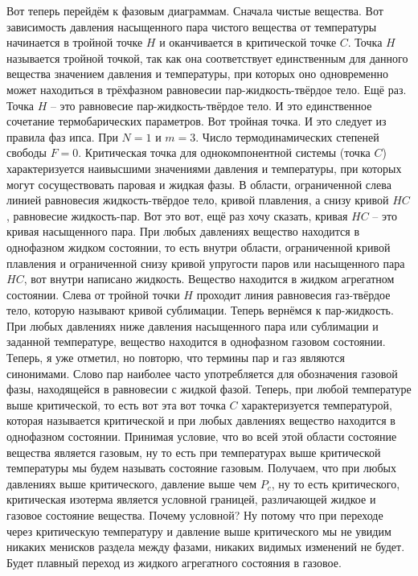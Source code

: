 \documentclass[main.tex]{subfiles}
\begin{document}
Вот теперь перейдём к фазовым диаграммам.
Сначала чистые вещества.
Вот зависимость давления насыщенного пара чистого вещества от температуры начинается в тройной точке $H$ и оканчивается в критической точке $C$.
Точка $H$ называется тройной точкой, так как она соответствует единственным для данного вещества значением давления и температуры, при которых оно одновременно может находиться в трёхфазном равновесии пар-жидкость-твёрдое тело.
Ещё раз.
Точка $H$ -- это равновесие пар-жидкость-твёрдое тело.
И это единственное сочетание термобарических параметров.
Вот тройная точка.
И это следует из правила фаз ипса.
При $N=1$ и $m=3$.
Число термодинамических степеней свободы $F=0$.
Критическая точка для однокомпонентной системы (точка $C$) характеризуется наивысшими значениями давления и температуры, при которых могут сосуществовать паровая и жидкая фазы.
В области, ограниченной слева линией равновесия жидкость-твёрдое тело, кривой плавления, а снизу кривой $HC$, равновесие жидкость-пар.
Вот это вот, ещё раз хочу сказать, кривая $HC$ -- это кривая насыщенного пара.
При любых давлениях вещество находится в однофазном жидком состоянии, то есть внутри области, ограниченной кривой плавления и ограниченной снизу кривой упругости паров или насыщенного пара $HC$, вот внутри написано жидкость.
Вещество находится в жидком агрегатном состоянии.
Слева от тройной точки $H$ проходит линия равновесия газ-твёрдое тело, которую называют кривой сублимации.
Теперь вернёмся к пар-жидкость.
При любых давлениях ниже давления насыщенного пара или сублимации и заданной температуре, вещество находится в однофазном газовом состоянии.
Теперь, я уже отметил, но повторю, что термины пар и газ являются синонимами.
Слово пар наиболее часто употребляется для обозначения газовой фазы, находящейся в равновесии с жидкой фазой.
Теперь, при любой температуре выше критической, то есть вот эта вот точка $C$ характеризуется температурой, которая называется критической и при любых давлениях вещество находится в однофазном состоянии.
Принимая условие, что во всей этой области состояние вещества является газовым, ну то есть при температурах выше критической температуры мы будем называть состояние газовым.
Получаем, что при любых давлениях выше критического, давление выше чем $P_c$, ну то есть критического, критическая изотерма является условной границей, различающей жидкое и газовое состояние вещества.
Почему условной?
Ну потому что при переходе через критическую температуру и давление выше критического мы не увидим никаких менисков раздела между фазами, никаких видимых изменений не будет.
Будет плавный переход из жидкого агрегатного состояния в газовое.
\end{document}
